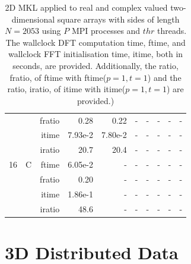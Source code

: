 \documentclass[a4paper]{article}
\begin{document}
\begin{table}[htbp]
\begin{center}
\begin{small}
\begin{tabular}{|r|r|r|r|r|r|r|r|r|r|}
             &             &  fratio &    0.28 &    0.22 &      - &      - &      - &      - &      - \\
             &             &  itime &    7.93e-2 &    7.80e-2 &      - &      - &      - &      - &      - \\
             &             &  iratio &    20.7 &   20.4 &     - &      - &      - &      - &      - \\\hline
   16 &   C &  ftime &    6.05e-2 &      - &      - &      - &      - &      - &      - \\
             &             &  fratio &    0.20 &      - &      - &      - &      - &      - &      - \\
             &             &  itime &    1.86e-1 &      - &      - &      - &      - &      - &      - \\
             &             &  iratio &    48.6 &     - &      - &      - &      - &      - &      - \\\hline
\end{tabular}
\caption{2D MKL applied to real and complex valued two-dimensional square arrays with sides of length $N=2053$ using $P$ MPI processes and $thr$ threads. The wallclock DFT computation time, ftime, and wallclock FFT initialisation time, itime, both in seconds, are provided. Additionally, the ratio, fratio, of ftime  with ftime($p=1,t=1$) and the ratio, iratio, of itime  with itime($p=1,t=1$) are provided.) }\label{Tbl:MKL2d2053}
\end{small}
\end{center}
\end{table}


\clearpage

\section{3D Distributed Data}\label{App:3Ddist}
\end{document}
